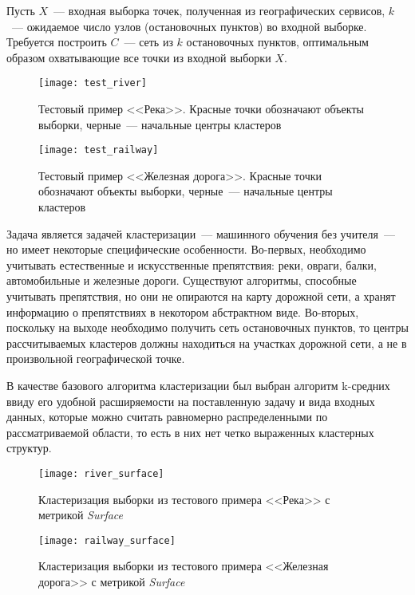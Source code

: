 Пусть \( X \)~--- входная выборка точек, полученная из географических сервисов, \( k \)~--- ожидаемое число узлов (остановочных пунктов) во входной выборке. Требуется построить \( C \)~--- сеть из \( k \) остановочных пунктов, оптимальным образом охватывающие все точки из входной выборки \( X \).

\begin{figure}[b!]
    \centering
    \texttt{[image: test\_river]}\\[1ex]
    \parbox{.7\textwidth}{\caption{Тестовый пример <<Река>>. Красные точки обозначают объекты выборки, черные~--- начальные центры кластеров} \label{img:river}}
    \texttt{[image: test\_railway]}\\[1ex]
    \parbox{.7\textwidth}{\caption{Тестовый пример <<Железная дорога>>. Красные точки обозначают объекты выборки, черные~--- начальные центры кластеров} \label{img:railway}}
\end{figure}

Задача является задачей кластеризации~--- машинного обучения без учителя~--- но имеет некоторые специфические особенности. Во-первых, необходимо учитывать естественные и искусственные препятствия: реки, овраги, балки, автомобильные и железные дороги. Существуют алгоритмы, способные учитывать препятствия, но они не опираются на карту дорожной сети, а хранят информацию о препятствиях в некотором абстрактном виде. Во-вторых, поскольку на выходе необходимо получить сеть остановочных пунктов, то центры рассчитываемых кластеров должны находиться на участках дорожной сети, а не в произвольной географической точке.

В качестве базового алгоритма кластеризации был выбран алгоритм k-средних ввиду его удобной расширяемости на поставленную задачу и вида входных данных, которые можно считать равномерно распределенными по рассматриваемой области, то есть в них нет четко выраженных кластерных структур.

\begin{figure}[b!]
    \centering
    \texttt{[image: river\_surface]}\\[1ex]
    \parbox{.9\textwidth}{\caption{Кластеризация выборки из тестового примера <<Река>> с метрикой \emph{Surface}} \label{img:river-sur}}
    \texttt{[image: railway\_surface]}\\[1ex]
    \parbox{.9\textwidth}{\caption{Кластеризация выборки из тестового примера <<Железная дорога>> с метрикой \emph{Surface}} \label{img:railway-sur}}
\end{figure}

